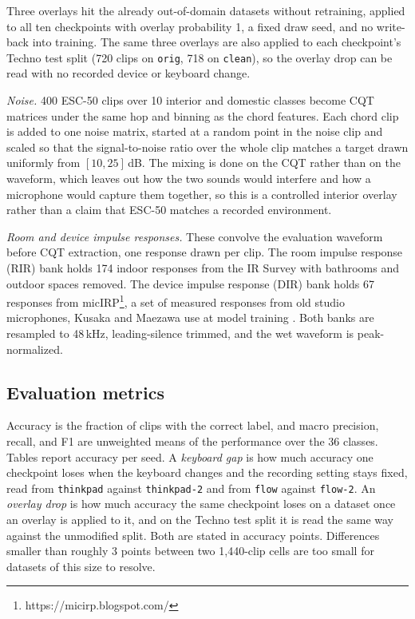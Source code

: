 \documentclass[pdflatex,sn-mathphys-num,iicol]{sn-jnl}
\begin{document}
Three overlays hit the already out-of-domain datasets without retraining, applied to all ten checkpoints with overlay probability 1, a fixed draw seed, and no write-back into training. The same three overlays are also applied to each checkpoint's Techno test split (720 clips on \texttt{orig}, 718 on \texttt{clean}), so the overlay drop can be read with no recorded device or keyboard change.

\emph{Noise.} 400 ESC-50 clips over 10 interior and domestic classes \cite{Piczak2015} become CQT matrices under the same hop and binning as the chord features. Each chord clip is added to one noise matrix, started at a random point in the noise clip and scaled so that the signal-to-noise ratio over the whole clip matches a target drawn uniformly from $[10,25]$\,dB.
The mixing is done on the CQT rather than on the waveform, which leaves out how the two sounds would interfere and how a microphone would capture them together, so this is a controlled interior overlay rather than a claim that ESC-50 matches a recorded environment.

\emph{Room and device impulse responses.} These convolve the evaluation waveform before CQT extraction, one response drawn per clip. The room impulse response (RIR) bank holds 174 indoor responses from the IR Survey \cite{Traer2016} with bathrooms and outdoor spaces removed. The device impulse response (DIR) bank holds 67 responses from micIRP\footnote{https://micirp.blogspot.com/}, a set of measured responses from old studio microphones, Kusaka and Maezawa use at model training \cite{Kusaka2024}. Both banks are resampled to 48\,kHz, leading-silence trimmed, and the wet waveform is peak-normalized.

\subsection{Evaluation metrics}\label{subsec_metrics}

Accuracy is the fraction of clips with the correct label, and macro precision, recall, and F1 are unweighted means of the performance over the 36 classes. Tables report accuracy per seed. A \emph{keyboard gap} is how much accuracy one checkpoint loses when the keyboard changes and the recording setting stays fixed, read from \texttt{thinkpad} against \texttt{thinkpad-2} and from \texttt{flow} against \texttt{flow-2}. An \emph{overlay drop} is how much accuracy the same checkpoint loses on a dataset once an overlay is applied to it, and on the Techno test split it is read the same way against the unmodified split. Both are stated in accuracy points. Differences smaller than roughly 3 points between two 1{,}440-clip cells are too small for datasets of this size to resolve.
\end{document}
